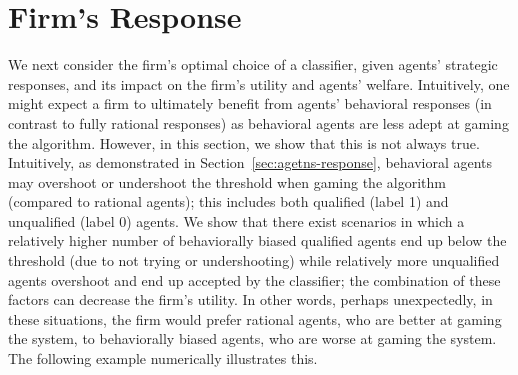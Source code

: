 \section{Firm's Response}\label{sec:firm-response}

We next consider the firm's optimal choice of a classifier, given agents' strategic responses, and its impact on the firm's utility and agents' welfare. Intuitively, one might expect a firm to ultimately benefit from agents' behavioral responses (in contrast to fully rational responses) as behavioral agents are less adept at gaming the algorithm. However, in this section, we show that this is not always true. Intuitively, as demonstrated in Section~\ref{sec:agetns-response}, behavioral agents may overshoot or undershoot the threshold when gaming the algorithm (compared to rational agents); this includes both qualified (label 1) and unqualified (label 0) agents. We show that there exist scenarios in which a relatively higher number of behaviorally biased qualified agents end up below the threshold (due to not trying or undershooting) while relatively more unqualified agents overshoot and end up accepted by the classifier; the combination of these factors can decrease the firm's utility. In other words, perhaps unexpectedly, in these situations, the firm would prefer rational agents, who are better at gaming the system, to behaviorally biased agents, who are worse at gaming the system. 
The following example numerically illustrates this. %

